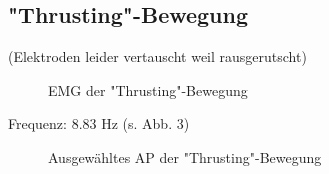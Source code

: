 \subsection{"{}Thrusting"{}-Bewegung}
(Elektroden leider vertauscht weil rausgerutscht)
\begin{figure}[H]
\caption{EMG der "{}Thrusting"{}-Bewegung}
\label{thrust}
\end{figure}
Frequenz: 8.83 Hz (s. Abb. 3)

\begin{figure}[H]
\caption{Ausgewähltes AP der "{}Thrusting"{}-Bewegung}
\label{thrust-ap}
\end{figure}



